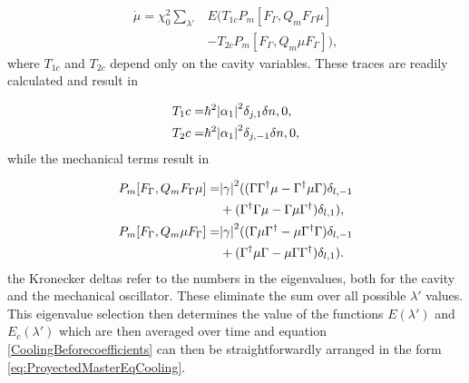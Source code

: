 \documentclass[reprint, amsmath,amssymb, aps,pra]{revtex4-1}
\begin{document}
\begin{align}
\dot{\mu}=\chi_0^2 \sum_{\lambda'}& E(T_{1c}P_m[F_\Gamma,Q_m F_\Gamma \mu]\\
&-T_{2c}P_m[F_\Gamma,Q_m \mu F_\Gamma ]),\nonumber
\end{align} where $T_{1c}$ and $T_{2c}$ depend only on the cavity variables. These traces are readily calculated and result in

\begin{align}
T_1c=& \hbar^2\abs{\alpha_1}^2 \delta_{j,1}\delta{n,0},\\
T_2c=& \hbar^2 \abs{\alpha_1}^2 \delta_{j,-1}\delta{n,0},\\
\end{align} while the mechanical terms result in

\begin{align}\label{CoolingBeforecoefficients}
P_m[F_\Gamma,Q_m F_\Gamma \mu] =& \abs{\gamma}^2((\Gamma\Gamma^\dagger \mu - \Gamma^\dagger \mu  \Gamma)\delta_{l,-1} \\
&+ (\Gamma^\dagger\Gamma \mu - \Gamma \mu  \Gamma^\dagger)\delta_{l,1}),\nonumber \\
P_m[F_\Gamma,Q_m  \mu F_\Gamma] =& \abs{\gamma}^2((\Gamma\mu\Gamma^\dagger  - \mu\Gamma^\dagger   \Gamma)\delta_{l,-1}\\ 
&+ (\Gamma^\dagger \mu\Gamma -  \mu \Gamma \Gamma^\dagger)\delta_{l,1}). \nonumber
\end{align} the Kronecker deltas refer to the numbers in the eigenvalues, both for the cavity and the mechanical oscillator. These eliminate the sum over all possible $\lambda'$ values. This eigenvalue selection then determines the value of the functions $E(\lambda')$ and $E_c(\lambda')$ which are then averaged over time and equation \eqref{CoolingBeforecoefficients} can then be straightforwardly arranged in the form \eqref{eq:ProyectedMasterEqCooling}.













\end{document}
